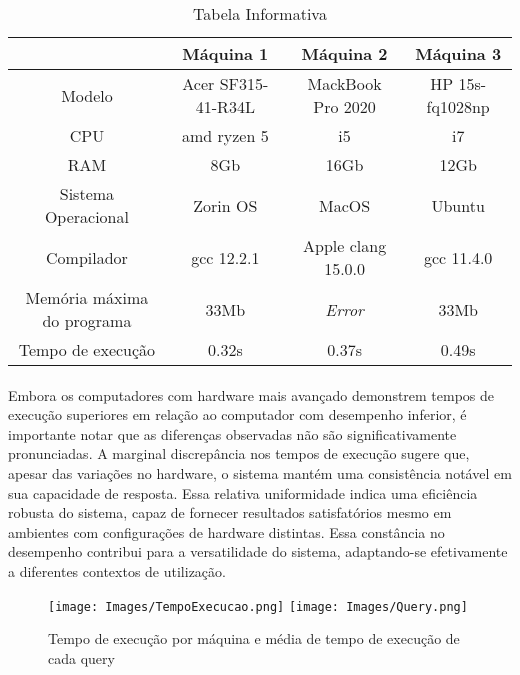 \documentclass{article}
\begin{document}
\begin{table}[h]
\begin{center}
\begin{tabular}{|c|c|c|c|} 
\rowcolor{lightgray}
\hline
  & Máquina 1 & Máquina 2 & Máquina 3 \\ %
\hline
\cellcolor{lightgray} Modelo & Acer SF315-41-R34L & MackBook Pro 2020 & HP 15s-fq1028np\\
\hline %
\cellcolor{lightgray} CPU & amd ryzen 5 & i5 & i7\\
\hline
\cellcolor{lightgray}RAM & 8Gb & 16Gb & 12Gb\\
\hline
\cellcolor{lightgray}Sistema Operacional & Zorin OS & MacOS & Ubuntu \\
\hline
\cellcolor{lightgray}Compilador & gcc 12.2.1 & Apple clang 15.0.0 & gcc 11.4.0 \\
\hline
\cellcolor{lightgray}Memória máxima do programa & 33Mb & \textit{Error} & 33Mb \\
\hline
\cellcolor{lightgray}Tempo de execução & 0.32s & 0.37s & 0.49s \\
\hline
\end{tabular}
\caption{Tabela Informativa}
\label{table:nonlin}
\end{center}
\end{table}
\vspace{-0.3cm}
\paragraph{}Embora os computadores com hardware mais avançado demonstrem tempos de execução superiores em relação ao computador com desempenho inferior, é importante notar que as diferenças observadas não são significativamente pronunciadas. A marginal discrepância nos tempos de execução sugere que, apesar das variações no hardware, o sistema mantém uma consistência notável em sua capacidade de resposta. Essa relativa uniformidade indica uma eficiência robusta do sistema, capaz de fornecer resultados satisfatórios mesmo em ambientes com configurações de hardware distintas. Essa constância no desempenho contribui para a versatilidade do sistema, adaptando-se efetivamente a diferentes contextos de utilização.
\vspace{-0.3cm}
\begin{figure}[H]
\begin{center}
        \texttt{[image: Images/TempoExecucao.png]} 
        \quad\quad\quad\texttt{[image: Images/Query.png]} 
        \caption{Tempo de execução por máquina e média de tempo de execução de cada query} 
\end{center}
\end{figure}
\end{document}
